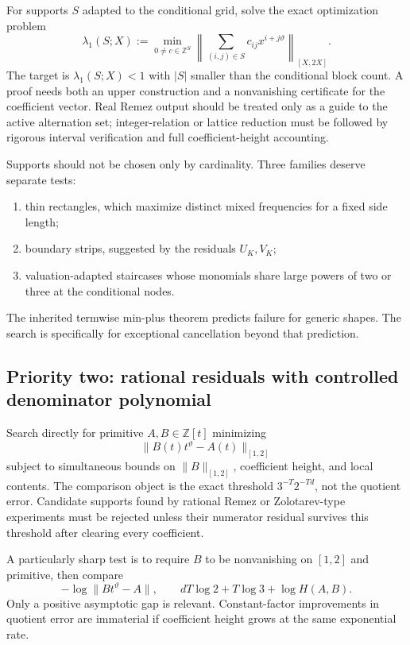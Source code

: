 \documentclass[11pt,oneside]{article}
\theoremstyle{definition}
\theoremstyle{remark}
\newcommand{\Z}{\mathbb Z}
\newcommand{\thetaq}{\vartheta}
\begin{document}
For supports \(S\) adapted to the conditional grid, solve the exact optimization problem
\[
 \lambda_1(S;X):=
 \min_{0\ne c\in\Z^S}
 \left\|\sum_{(i,j)\in S}c_{ij}x^{i+j\thetaq}\right\|_{[X,2X]}.
\]
The target is \(\lambda_1(S;X)<1\) with \(|S|\) smaller than the conditional block count.  A
proof needs both an upper construction and a nonvanishing certificate for the coefficient
vector.  Real Remez output should be treated only as a guide to the active alternation set;
integer-relation or lattice reduction must be followed by rigorous interval verification and
full coefficient-height accounting.

Supports should not be chosen only by cardinality.  Three families deserve separate tests:
\begin{enumerate}
\item thin rectangles, which maximize distinct mixed frequencies for a fixed side length;
\item boundary strips, suggested by the residuals \(U_K,V_K\);
\item valuation-adapted staircases whose monomials share large powers of two or three at the
conditional nodes.
\end{enumerate}
The inherited termwise min-plus theorem predicts failure for generic shapes.  The search is
specifically for exceptional cancellation beyond that prediction.

\subsection{Priority two: rational residuals with controlled denominator polynomial}

Search directly for primitive \(A,B\in\Z[t]\) minimizing
\[
 \|B(t)t^{\thetaq}-A(t)\|_{[1,2]}
\]
subject to simultaneous bounds on \(\|B\|_{[1,2]}\), coefficient height, and local contents.
The comparison object is the exact threshold
\(3^{-T}2^{-Td}\), not the quotient error.  Candidate supports found by rational Remez or
Zolotarev-type experiments must be rejected unless their numerator residual survives this
threshold after clearing every coefficient.

A particularly sharp test is to require \(B\) to be nonvanishing on \([1,2]\) and primitive,
then compare
\[
 -\log\|Bt^{\thetaq}-A\|,
 \qquad
 dT\log2+T\log3+\log H(A,B).
\]
Only a positive asymptotic gap is relevant.  Constant-factor improvements in quotient error
are immaterial if coefficient height grows at the same exponential rate.
\end{document}
